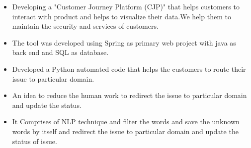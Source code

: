 \documentclass[10pt,a4paper,ragged2e]{altacv}
\begin{document}

\begin{fullwidth}
\makecvheader
\end{fullwidth}



\begin{itemize}
\item   Developing a "Customer Journey Platform (CJP)" that helps customers to interact with product and helps to visualize their data.We help them to maintain the security and services of customers.
\item The tool was developed using Spring as primary web  project with java as back end and SQL as database.

\end{itemize}

\begin{itemize}
\item  Developed a Python automated code that helps the customers to route their issue to particular domain.
\item An idea to reduce the human work to redirect the issue to particular domain and update the status.
\item It Comprises of NLP technique and ﬁlter the words and save the unknown words by itself and redirect the issue to particular domain and update the status of issue.
\end{itemize}
\end{document}
